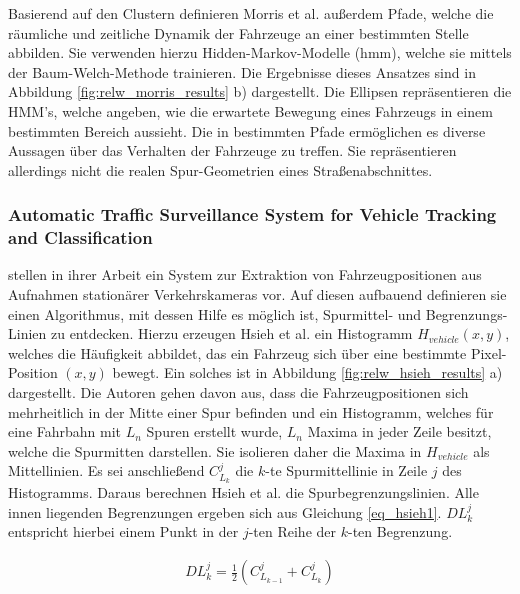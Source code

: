 Basierend auf den Clustern definieren Morris et al. außerdem Pfade, welche die räumliche und zeitliche Dynamik
der Fahrzeuge an einer bestimmten Stelle abbilden. Sie verwenden hierzu Hidden-Markov-Modelle (\acrshort*{hmm}),
welche sie mittels der Baum-Welch-Methode trainieren.
Die Ergebnisse dieses Ansatzes sind in Abbildung \ref{fig:relw_morris_results} b) dargestellt. Die
Ellipsen repräsentieren die HMM's, welche angeben, wie die erwartete Bewegung eines Fahrzeugs in einem
bestimmten Bereich aussieht.
Die in \cite[]{Morris2011} bestimmten Pfade ermöglichen es diverse Aussagen über das Verhalten der Fahrzeuge
zu treffen. Sie repräsentieren allerdings nicht die realen Spur-Geometrien eines Straßenabschnittes.

\subsubsection*{Automatic Traffic Surveillance System for Vehicle Tracking and Classification}

\cite[]{Hsieh2006} stellen in ihrer Arbeit ein System zur Extraktion von Fahrzeugpositionen aus Aufnahmen
stationärer Verkehrskameras vor. Auf diesen aufbauend definieren sie einen Algorithmus, mit dessen Hilfe es
möglich ist, Spurmittel- und Begrenzungs-Linien zu entdecken.
Hierzu erzeugen Hsieh et al. ein Histogramm $H_{vehicle}(x,y)$, welches die Häufigkeit abbildet, das ein Fahrzeug sich über eine
bestimmte Pixel-Position $(x, y)$ bewegt. Ein solches ist in Abbildung \ref{fig:relw_hsieh_results} a) dargestellt.
Die Autoren gehen davon aus, dass die Fahrzeugpositionen sich mehrheitlich in der Mitte einer Spur befinden und
ein Histogramm, welches für eine Fahrbahn mit $L_n$ Spuren erstellt wurde, $L_n$ Maxima in jeder Zeile besitzt,
welche die Spurmitten darstellen.
Sie isolieren daher die Maxima in $H_{vehicle}$ als Mittellinien. Es sei anschließend $C_{L_k}^{j}$ die $k$-te Spurmittellinie
in Zeile $j$ des Histogramms. Daraus berechnen Hsieh et al. die Spurbegrenzungslinien. Alle innen liegenden
Begrenzungen ergeben sich aus Gleichung \ref{eq_hsieh1}. $DL_{k}^{j}$ entspricht hierbei einem Punkt
in der $j$-ten Reihe der $k$-ten Begrenzung.

\begin{ceqn}
\begin{align}
\label{eq_hsieh1}
    DL_{k}^{j} = \frac{1}{2} (C_{L_{k-1}}^{j} + C_{L_{k}}^{j})
\end{align}
\end{ceqn}

